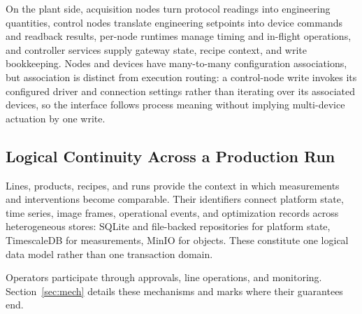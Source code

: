 On the plant side, acquisition nodes turn protocol readings into engineering
quantities, control nodes translate engineering setpoints into device commands and
readback results, per-node runtimes manage timing and in-flight operations, and
controller services supply gateway state, recipe context, and write bookkeeping.
Nodes and devices have many-to-many configuration associations, but association is
distinct from execution routing: a control-node write invokes its configured driver
and connection settings rather than iterating over its associated devices, so the
interface follows process meaning without implying multi-device actuation by one
write.

\subsection{Logical Continuity Across a Production Run}
Lines, products, recipes, and runs provide the context in which measurements and
interventions become comparable. Their identifiers connect platform state, time
series, image frames, operational events, and optimization records across
heterogeneous stores: SQLite and file-backed repositories for platform state,
TimescaleDB for measurements, MinIO for objects. These constitute one logical data
model rather than one transaction domain.

Operators participate through approvals, line operations, and monitoring.
Section~\ref{sec:mech} details these mechanisms and marks where their guarantees
end.
